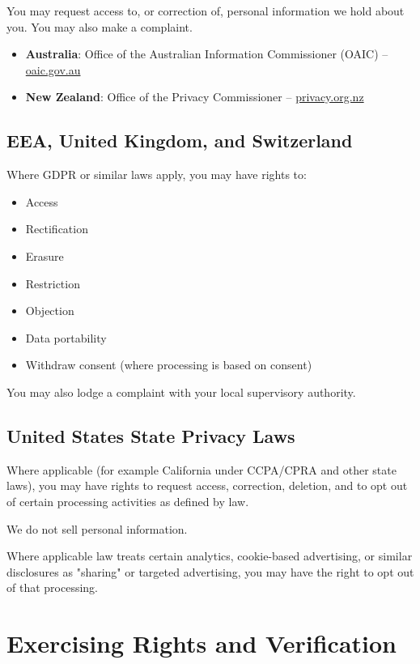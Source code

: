 \documentclass[11pt]{article}
\begin{document}
You may request access to, or correction of, personal information we hold about you. You may also make a complaint.

\begin{itemize}
\item \textbf{Australia}: Office of the Australian Information Commissioner (OAIC) -- \href{https://www.oaic.gov.au}{oaic.gov.au}
\item \textbf{New Zealand}: Office of the Privacy Commissioner -- \href{https://www.privacy.org.nz}{privacy.org.nz}
\end{itemize}

\subsection{EEA, United Kingdom, and Switzerland}

Where GDPR or similar laws apply, you may have rights to:

\begin{itemize}
\item Access
\item Rectification
\item Erasure
\item Restriction
\item Objection
\item Data portability
\item Withdraw consent (where processing is based on consent)
\end{itemize}

You may also lodge a complaint with your local supervisory authority.

\subsection{United States State Privacy Laws}

Where applicable (for example California under CCPA/CPRA and other state laws), you may have rights to request access, correction, deletion, and to opt out of certain processing activities as defined by law.

We do not sell personal information.

Where applicable law treats certain analytics, cookie-based advertising, or similar disclosures as "sharing" or targeted advertising, you may have the right to opt out of that processing.

\section{Exercising Rights and Verification}
\end{document}
